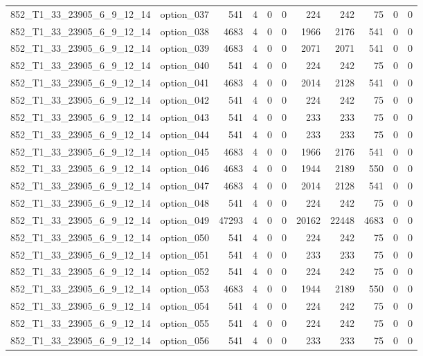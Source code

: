 \begin{tabular}{llrrrrrrrrr}
852\_T1\_33\_23905\_6\_9\_12\_14 & option\_037 & 541 & 4 & 0 & 0 & 224 & 242 & 75 & 0 & 0 \\
852\_T1\_33\_23905\_6\_9\_12\_14 & option\_038 & 4683 & 4 & 0 & 0 & 1966 & 2176 & 541 & 0 & 0 \\
852\_T1\_33\_23905\_6\_9\_12\_14 & option\_039 & 4683 & 4 & 0 & 0 & 2071 & 2071 & 541 & 0 & 0 \\
852\_T1\_33\_23905\_6\_9\_12\_14 & option\_040 & 541 & 4 & 0 & 0 & 224 & 242 & 75 & 0 & 0 \\
852\_T1\_33\_23905\_6\_9\_12\_14 & option\_041 & 4683 & 4 & 0 & 0 & 2014 & 2128 & 541 & 0 & 0 \\
852\_T1\_33\_23905\_6\_9\_12\_14 & option\_042 & 541 & 4 & 0 & 0 & 224 & 242 & 75 & 0 & 0 \\
852\_T1\_33\_23905\_6\_9\_12\_14 & option\_043 & 541 & 4 & 0 & 0 & 233 & 233 & 75 & 0 & 0 \\
852\_T1\_33\_23905\_6\_9\_12\_14 & option\_044 & 541 & 4 & 0 & 0 & 233 & 233 & 75 & 0 & 0 \\
852\_T1\_33\_23905\_6\_9\_12\_14 & option\_045 & 4683 & 4 & 0 & 0 & 1966 & 2176 & 541 & 0 & 0 \\
852\_T1\_33\_23905\_6\_9\_12\_14 & option\_046 & 4683 & 4 & 0 & 0 & 1944 & 2189 & 550 & 0 & 0 \\
852\_T1\_33\_23905\_6\_9\_12\_14 & option\_047 & 4683 & 4 & 0 & 0 & 2014 & 2128 & 541 & 0 & 0 \\
852\_T1\_33\_23905\_6\_9\_12\_14 & option\_048 & 541 & 4 & 0 & 0 & 224 & 242 & 75 & 0 & 0 \\
852\_T1\_33\_23905\_6\_9\_12\_14 & option\_049 & 47293 & 4 & 0 & 0 & 20162 & 22448 & 4683 & 0 & 0 \\
852\_T1\_33\_23905\_6\_9\_12\_14 & option\_050 & 541 & 4 & 0 & 0 & 224 & 242 & 75 & 0 & 0 \\
852\_T1\_33\_23905\_6\_9\_12\_14 & option\_051 & 541 & 4 & 0 & 0 & 233 & 233 & 75 & 0 & 0 \\
852\_T1\_33\_23905\_6\_9\_12\_14 & option\_052 & 541 & 4 & 0 & 0 & 224 & 242 & 75 & 0 & 0 \\
852\_T1\_33\_23905\_6\_9\_12\_14 & option\_053 & 4683 & 4 & 0 & 0 & 1944 & 2189 & 550 & 0 & 0 \\
852\_T1\_33\_23905\_6\_9\_12\_14 & option\_054 & 541 & 4 & 0 & 0 & 224 & 242 & 75 & 0 & 0 \\
852\_T1\_33\_23905\_6\_9\_12\_14 & option\_055 & 541 & 4 & 0 & 0 & 224 & 242 & 75 & 0 & 0 \\
852\_T1\_33\_23905\_6\_9\_12\_14 & option\_056 & 541 & 4 & 0 & 0 & 233 & 233 & 75 & 0 & 0 \\

\end{tabular}
